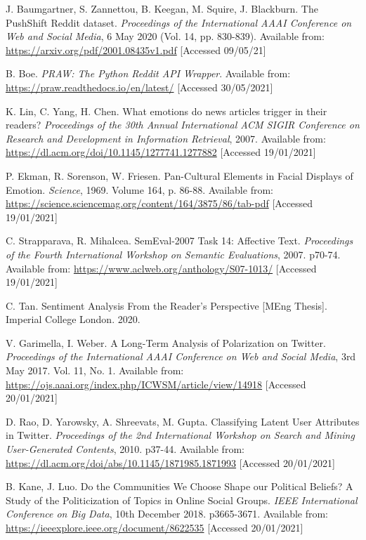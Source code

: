 \begin{thebibliography}{9}
J. Baumgartner, S. Zannettou, B. Keegan, M. Squire, J. Blackburn. The PushShift Reddit dataset. \textit{Proceedings of the International AAAI Conference on Web and Social Media}, 6 May 2020 (Vol. 14, pp. 830-839). Available from: \url{https://arxiv.org/pdf/2001.08435v1.pdf} [Accessed 09/05/21]

B. Boe. \textit{PRAW: The Python Reddit API Wrapper}. Available from: \url{https://praw.readthedocs.io/en/latest/} [Accessed 30/05/2021]

K. Lin, C. Yang, H. Chen. What emotions do news articles trigger in their readers? \textit{Proceedings of the 30th Annual International ACM SIGIR Conference on Research and Development in Information Retrieval}, 2007. Available from: \url{https://dl.acm.org/doi/10.1145/1277741.1277882} [Accessed 19/01/2021]

P. Ekman, R. Sorenson, W. Friesen. Pan-Cultural Elements in Facial Displays of Emotion. \textit{Science}, 1969. Volume 164, p. 86-88. Available from: \url{https://science.sciencemag.org/content/164/3875/86/tab-pdf} [Accessed 19/01/2021]

C. Strapparava, R. Mihalcea. SemEval-2007 Task 14: Affective Text. \textit{Proceedings of the Fourth International Workshop on Semantic Evaluations}, 2007. p70-74. Available from: \url{https://www.aclweb.org/anthology/S07-1013/} [Accessed 19/01/2021]

C. Tan. Sentiment Analysis From the Reader’s Perspective [MEng Thesis]. Imperial College London. 2020.

V. Garimella, I. Weber. A Long-Term Analysis of Polarization on Twitter. \textit{Proceedings of the International AAAI Conference on Web and Social Media}, 3rd May 2017. Vol. 11, No. 1. Available from: \url{https://ojs.aaai.org/index.php/ICWSM/article/view/14918} [Accessed 20/01/2021]

D. Rao, D. Yarowsky, A. Shreevats, M. Gupta. Classifying Latent User Attributes in Twitter. \textit{Proceedings of the 2nd International Workshop on Search and Mining User-Generated Contents}, 2010. p37-44. Available from: \url{https://dl.acm.org/doi/abs/10.1145/1871985.1871993} [Accessed 20/01/2021]

B. Kane, J. Luo. Do the Communities We Choose Shape our Political Beliefs? A Study of the Politicization of Topics in Online Social Groups. \textit{IEEE International Conference on Big Data}, 10th December 2018. p3665-3671. Available from: \url{https://ieeexplore.ieee.org/document/8622535} [Accessed 20/01/2021]


\end{thebibliography}
